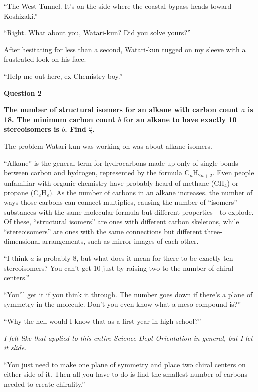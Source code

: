 \documentclass[
    a4paper,
    12pt,
    twoside,
    openany,
    UTF8,
    fontset=windows
]{ctexbook}
\begin{document}
``The West Tunnel. It's on the side where the coastal bypass heads toward Koshizaki.''

``Right. What about you, Watari-kun? Did you solve yours?''

After hesitating for less than a second, Watari-kun tugged on my sleeve with a frustrated look on his face.

``Help me out here, ex-Chemistry boy.''

\begin{center}
\textbf{Question 2}
\end{center}

\textbf{The number of structural isomers for an alkane with carbon count $a$ is 18. The minimum carbon count $b$ for an alkane to have exactly 10 stereoisomers is $b$. Find $\frac{a}{b}$.}

The problem Watari-kun was working on was about alkane isomers.

``Alkane'' is the general term for hydrocarbons made up only of single bonds between carbon and hydrogen, represented by the formula $\mathrm{C}_n\mathrm{H}_{2n+2}$. Even people unfamiliar with organic chemistry have probably heard of methane ($\mathrm{CH}_4$) or propane ($\mathrm{C}_3\mathrm{H}_8$). As the number of carbons in an alkane increases, the number of ways those carbons can connect multiplies, causing the number of ``isomers''---substances with the same molecular formula but different properties---to explode. Of these, ``structural isomers'' are ones with different carbon skeletons, while ``stereoisomers'' are ones with the same connections but different three-dimensional arrangements, such as mirror images of each other.

``I think $a$ is probably 8, but what does it mean for there to be exactly ten stereoisomers? You can't get 10 just by raising two to the number of chiral centers.''

``You'll get it if you think it through. The number goes down if there's a plane of symmetry in the molecule. Don't you even know what a meso compound is?''

``Why the hell would I know that as a first-year in high school?''

\textit{I felt like that applied to this entire Science Dept Orientation in general, but I let it slide.}

``You just need to make one plane of symmetry and place two chiral centers on either side of it. Then all you have to do is find the smallest number of carbons needed to create chirality.''
\end{document}
